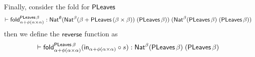 \documentclass[acmsmall,review,anonymous]{acmart}
\theoremstyle{definition}
\begin{document}
Finally, consider the fold for $\mathsf{PLeaves}$
\[
	\vdash \mathsf{fold}_{\alpha + \phi(\alpha \times \alpha)}^{\mathsf{PLeaves}\,\beta}
	: \mathsf{Nat}^{\emptyset}
	(\mathsf{Nat}^{\beta} (\beta + \mathsf{PLeaves}\,(\beta \times \beta)) \; (\mathsf{PLeaves}\,\beta))\;
	(\mathsf{Nat}^{\beta} (\mathsf{PLeaves}\,\beta) \; (\mathsf{PLeaves}\,\beta))
\]
then we define the $\mathsf{reverse}$ function as
\[
	\vdash \mathsf{fold}_{\alpha + \phi(\alpha \times \alpha)}^{\mathsf{PLeaves}\, \beta} (\mathsf{in}_{\alpha + \phi(\alpha \times \alpha)} \circ s)
	: \mathsf{Nat}^{\beta} (\mathsf{PLeaves}\,\beta) \; (\mathsf{PLeaves}\,\beta)
\]
\end{document}
